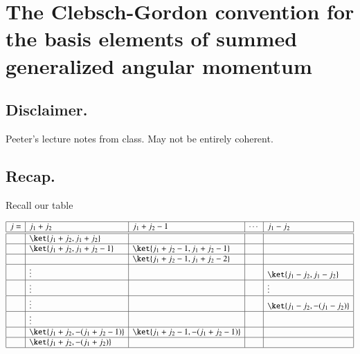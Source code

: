 %
%

\chapter{The Clebsch-Gordon convention for the basis elements of summed generalized angular momentum}
\label{chap:qmTwoL18}
{}
\date{Nov 12, 2011}

\beginArtWithToc

\section{Disclaimer.}

Peeter's lecture notes from class.  May not be entirely coherent.

\section{Recap.}

Recall our table

\begin{equation}\label{eqn:qmTwoL18:10}
\begin{array}{| l | l | l | l | l |}
\hline
j = & j_1 + j_2				& j_1 + j_2 -1 				& \cdots 	& j_1 - j_2 \\
\hline
\hline
  &  \ket{j_1 + j_2, j_1 + j_2}	 	&					& 		& \\
\hline
  &  \ket{j_1 + j_2, j_1 + j_2 - 1}	&  \ket{j_1 + j_2 - 1, j_1 + j_2 - 1}	& 		& \\
\hline
  &                                     & \ket{j_1 + j_2 - 1, j_1 + j_2 - 2}	& 		& \\
\hline
  & \vdots 	 			&					& 		& \ket{j_1 - j_2, j_1 - j_2} \\
\hline
  & \vdots 	 			&					& 		& \vdots \\
\hline
  & \vdots 	 			&					& 		& \ket{j_1 - j_2, -(j_1 - j_2)} \\
\hline
  & \vdots 	 			&					& 		& \\
\hline
  &  \ket{j_1 + j_2, -(j_1 + j_2 - 1)}	& \ket{j_1 + j_2 -1, -(j_1 + j_2 - 1)}	& 		& \\
\hline
  &  \ket{j_1 + j_2, -(j_1 + j_2)}	&					& 		&  \\
\hline
\end{array}
\end{equation}

